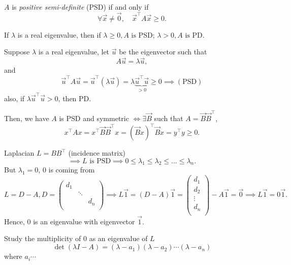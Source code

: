 \begin{definition}
	\(A \) is \emph{positive semi-definite} (PSD) if and only if
	\[
		\forall \vec{x} \neq  \vec{0},\quad \vec{x}^{\top}A \vec{x} \geq  0.
	\]
\end{definition}

\begin{remark}
	If \(\lambda\) is a real eigenvalue, then if \(\lambda \geq  0, A \text{ is PSD}\); \(\lambda > 0, A \text{ is PD}\).
\end{remark}
\begin{explanation}
	Suppose \(\lambda\) is a real eigenvalue, let \(\vec{u}\) be the eigenvector such that
	\[
		A \vec{u} = \lambda \vec{u},
	\]
	and
	\[
		\vec{u}^{\top} A \vec{u} = \vec{u}^{\top} (\lambda \vec{u}) = \lambda \underbrace{\vec{u}^{\top}\vec{u}}_{>0} \geq 0\implies(\text{PSD})
	\]
	also, if \(\lambda \vec{u}^{\top} \vec{u} > 0\), then PD.

	Then, we have \(A\) is PSD and symmetric \(\iff \exists \vec{B}\) such that \(A = \vec{B} \vec{B}^{\top}\),
	\[
		x^{\top} A x = x^{\top} \vec{B} \vec{B}^{\top} x = (\vec{B}x)^{\top} \vec{B}x = y^{\top} y \geq 0.
	\]

	Laplacian \(L = B B^{\top}\) (incidence matrix)
	\[
		\implies L \text{ is PSD}\implies 0 \leq \lambda_1 \leq \lambda_2 \leq \ldots \leq \lambda_n.
	\]
	But \(\lambda_1 = 0\), \(0\) is coming from
	\[
		L = D-A, D = \begin{pmatrix}
			d_1 &        &     \\
			    & \ddots &     \\
			    &        & d_n \\
		\end{pmatrix}\implies L \vec{1} = (D - A)\vec{1} = \begin{pmatrix}
			d_1    \\
			d_2    \\
			\vdots \\
			d_n    \\
		\end{pmatrix} - A\vec{1} = \vec{0}\implies L \vec{1} = 0 \vec{1}.
	\]
	Hence, \(0\) is an eigenvalue with eigenvector \(\vec{1}\).
\end{explanation}

\begin{note}
	Study the multiplicity of \(0\) as an eigenvalue of \(L\)
	\[
		\det(\lambda I - A) = (\lambda - a_1)(\lambda - a_2)\cdots (\lambda - a_n)
	\]
	where \(a_i\cdots \)
\end{note}

